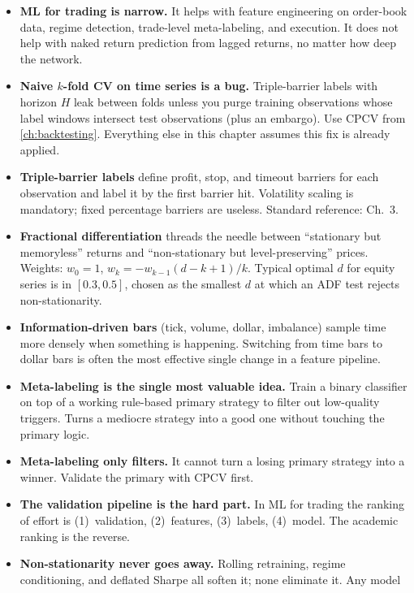 \begin{itemize}
  \item \textbf{ML for trading is narrow.} It helps with
  feature engineering on order-book data, regime
  detection, trade-level meta-labeling, and execution. It
  does not help with naked return prediction from lagged
  returns, no matter how deep the network.
  \item \textbf{Naive $k$-fold CV on time series is a bug.}
  Triple-barrier labels with horizon $H$ leak between
  folds unless you purge training observations whose
  label windows intersect test observations (plus an
  embargo). Use CPCV from \cref{ch:backtesting}.
  Everything else in this chapter assumes this fix is
  already applied.
  \item \textbf{Triple-barrier labels} define profit,
  stop, and timeout barriers for each observation and
  label it by the first barrier hit. Volatility scaling
  is mandatory; fixed percentage barriers are useless.
  Standard reference: \citeAFML{} Ch.~3.
  \item \textbf{Fractional differentiation} threads the
  needle between ``stationary but memoryless'' returns
  and ``non-stationary but level-preserving'' prices.
  Weights: $w_0 = 1$,
  $w_k = -w_{k-1}(d - k + 1)/k$. Typical optimal $d$
  for equity series is in $[0.3, 0.5]$, chosen as the
  smallest $d$ at which an ADF test rejects
  non-stationarity.
  \item \textbf{Information-driven bars} (tick, volume,
  dollar, imbalance) sample time more densely when
  something is happening. Switching from time bars to
  dollar bars is often the most effective single
  change in a feature pipeline.
  \item \textbf{Meta-labeling is the single
  most valuable idea.} Train a binary classifier on
  top of a working rule-based primary strategy to filter
  out low-quality triggers. Turns a mediocre strategy
  into a good one without touching the primary logic.
  \item \textbf{Meta-labeling only filters.} It cannot
  turn a losing primary strategy into a winner. Validate
  the primary with CPCV first.
  \item \textbf{The validation pipeline is the hard
  part.} In ML for trading the ranking of effort is
  (1)~validation, (2)~features, (3)~labels, (4)~model.
  The academic ranking is the reverse.
  \item \textbf{Non-stationarity never goes away.}
  Rolling retraining, regime conditioning, and deflated
  Sharpe all soften it; none eliminate it. Any model

\end{itemize}
